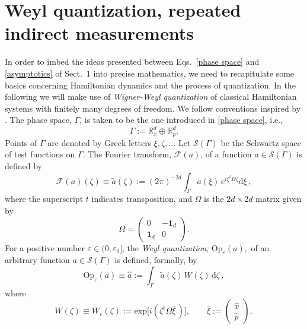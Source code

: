\documentclass[12pt]{article}
\begin{document}
\section{Weyl quantization, repeated indirect measurements} \label{quantization} 
In order to imbed the ideas presented between Eqs.~\eqref{phase space} and \eqref{asymptotics} of Sect.~1 
into precise mathematics, we need to recapitulate some basics concerning Hamiltonian dynamics and the 
process of quantization. In the following we will make use of \textit{Wigner-Weyl quantization} of classical Hamiltonian 
systems with finitely many degrees of freedom. We follow conventions inspired by \cite[\S 8.4]{DerGerard}. 
The phase space, $\Gamma$, is taken to be the one introduced in \eqref{phase space}, i.e.,
\begin{equation}\label{ps}
\Gamma:= \mathbb{R}^{d}_x \oplus \mathbb{R}^{d}_p.
\end{equation}
Points of $\Gamma$ are denoted by Greek letters $\xi, \zeta, \dots$ Let $\mathcal{S}(\Gamma)$ be the Schwartz 
space of test functions on $\Gamma$. The Fourier transform, $\mathcal{F}(a)$, of a function 
$a\in \mathcal{S}(\Gamma)$ is defined by
\begin{equation}\label{FT}
\mathcal{F}(a)(\zeta)\equiv \tilde{a}(\zeta):= (2 \pi)^{-2d}\int_{\Gamma} a(\xi) \,e^{i \xi^{t}\Omega\zeta} \text{d}\xi\,,
\end{equation}
where the superscript $t$ indicates transposition, and $\Omega$ is the $2d\times 2d$ matrix given by
\begin{equation}\label{Omega}
\Omega = \begin{pmatrix} 0& -\mathbf{1}_{d}\\ \mathbf{1}_{d}& 0 \end{pmatrix}.
\end{equation}
For a positive number $\varepsilon \in (0, \varepsilon_0]$, the \textit{Weyl quantization}, $\text{Op}_{\varepsilon}(a),$ 
of an arbitrary function $a\in \mathcal{S}(\Gamma)$ is defined, formally, by
\begin{equation}\label{WQ}
\text{Op}_{\varepsilon}(a)\equiv \widehat{a}:= \int_{\Gamma} \tilde{a}(\zeta)\, W(\zeta)\, \text{d}\zeta\,,
\end{equation}
where
\begin{equation}\label{W Op}
W(\zeta)\equiv W_{\varepsilon}(\zeta) :=\text{exp}\big[i(\zeta^{t}\Omega\widehat{\xi}\,)\big], \qquad \widehat{\xi}:= \begin{pmatrix} \hat{x} \\ \hat{p} \end{pmatrix},
\end{equation}
\end{document}
